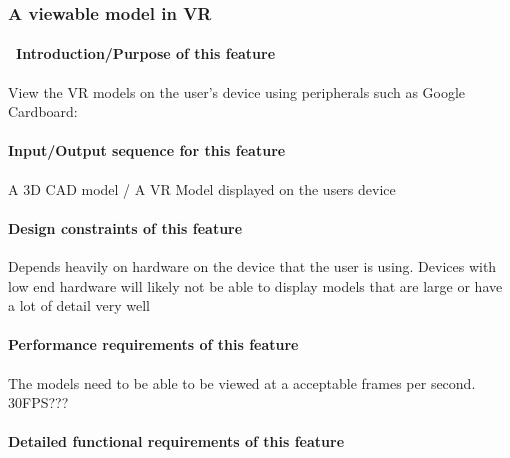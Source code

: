 \documentclass[letterpaper, 10pt, draftclsnofoot, onecolumn]{IEEEtran}
\begin{document}
{%


\subsubsection[{Updated Vrok-it}]{\rmfamily\bfseries\color{black} A viewable model in VR }
\paragraph[\ Introduction/Purpose of this
feature]{\foreignlanguage{english}{\ }\foreignlanguage{english}{Introduction/Purpose
of this feature}}
{\color{black}
View the VR models on the user's device using peripherals such as Google Cardboard:   }

\paragraph[Input/Output sequence for this
feature]{\rmfamily\bfseries\color{black}
Input/Output sequence for this feature}
{\color{black}
A 3D CAD model / A VR Model displayed on the users device  }

\paragraph[Design constraints of this
feature]{\rmfamily\bfseries\color{black} Design
constraints of this feature}
{\color{black}
Depends heavily on hardware on the device that the user is using. Devices with low end hardware will likely not be able to display models that are large or have a lot of detail very well  }

\paragraph[Performance requirements of this
feature]{\rmfamily\bfseries\color{black}
Performance requirements of this feature}
{\color{black}
The models need to be able to be viewed at a acceptable frames per second. 30FPS???  }

\paragraph[Detailed functional requirements of this
feature]{\rmfamily\bfseries\color{black}
Detailed functional requirements of this feature}


}
\end{document}
